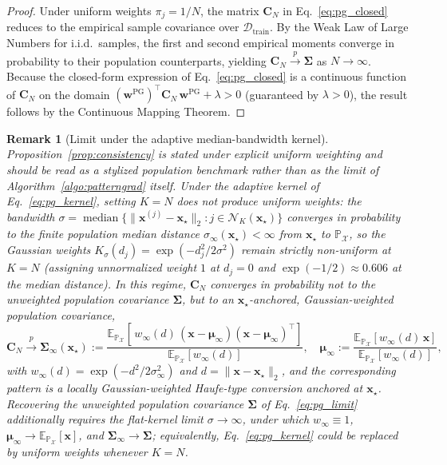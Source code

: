 \documentclass[pdflatex,sn-mathphys-num]{sn-jnl}
\theoremstyle{thmstyleone}
\theoremstyle{thmstyletwo}%
\newtheorem{remark}{Remark}%
\theoremstyle{thmstylethree}%
\begin{document}
\begin{proof}
Under uniform weights $\pi_j = 1/N$, the matrix $\mathbf{C}_N$ in Eq.~\eqref{eq:pg_closed} reduces to the empirical sample covariance over $\mathcal{D}_{\text{train}}$. By the Weak Law of Large Numbers for i.i.d.\ samples, the first and second empirical moments converge in probability to their population counterparts, yielding $\mathbf{C}_N \xrightarrow{p} \boldsymbol{\Sigma}$ as $N \to \infty$. Because the closed-form expression of Eq.~\eqref{eq:pg_closed} is a continuous function of $\mathbf{C}_N$ on the domain $(\mathbf{w}^{\text{PG}})^\top \mathbf{C}_N\, \mathbf{w}^{\text{PG}} + \lambda > 0$ (guaranteed by $\lambda > 0$), the result follows by the Continuous Mapping Theorem.
\end{proof}

\begin{remark}[Limit under the adaptive median-bandwidth kernel]\label{rem:adaptivelimit}
Proposition~\ref{prop:consistency} is stated under explicit uniform weighting and should be read as a stylized population benchmark rather than as the limit of Algorithm~\ref{algo:patterngrad} itself. Under the adaptive kernel of Eq.~\eqref{eq:pg_kernel}, setting $K = N$ does not produce uniform weights: the bandwidth $\sigma = \operatorname{median}\{\|\mathbf{x}^{(j)} - \mathbf{x}_\star\|_2 : j \in \mathcal{N}_K(\mathbf{x}_\star)\}$ converges in probability to the finite population median distance $\sigma_\infty(\mathbf{x}_\star) < \infty$ from $\mathbf{x}_\star$ to $\mathbb{P}_{\mathcal{X}}$, so the Gaussian weights $K_\sigma(d_j) = \exp(-d_j^2 / 2\sigma^2)$ remain strictly non-uniform at $K = N$ (assigning unnormalized weight $1$ at $d_j = 0$ and $\exp(-1/2) \approx 0.606$ at the median distance). In this regime, $\mathbf{C}_N$ converges in probability not to the unweighted population covariance $\boldsymbol{\Sigma}$, but to an $\mathbf{x}_\star$-anchored, Gaussian-weighted population covariance,
\begin{equation*}
    \mathbf{C}_N \xrightarrow{p} \boldsymbol{\Sigma}_\infty(\mathbf{x}_\star) \mathrel{:=} \frac{\mathbb{E}_{\mathbb{P}_{\mathcal{X}}}\!\left[\, w_\infty(d)\, (\mathbf{x} - \boldsymbol{\mu}_\infty)(\mathbf{x} - \boldsymbol{\mu}_\infty)^\top \right]}{\mathbb{E}_{\mathbb{P}_{\mathcal{X}}}[w_\infty(d)]}, \quad \boldsymbol{\mu}_\infty \mathrel{:=} \frac{\mathbb{E}_{\mathbb{P}_{\mathcal{X}}}[w_\infty(d)\,\mathbf{x}]}{\mathbb{E}_{\mathbb{P}_{\mathcal{X}}}[w_\infty(d)]},
\end{equation*}
with $w_\infty(d) = \exp(-d^2 / 2\sigma_\infty^2)$ and $d = \|\mathbf{x} - \mathbf{x}_\star\|_2$, and the corresponding pattern is a locally Gaussian-weighted Haufe-type conversion anchored at $\mathbf{x}_\star$. Recovering the unweighted population covariance $\boldsymbol{\Sigma}$ of Eq.~\eqref{eq:pg_limit} additionally requires the flat-kernel limit $\sigma \to \infty$, under which $w_\infty \equiv 1$, $\boldsymbol{\mu}_\infty \to \mathbb{E}_{\mathbb{P}_{\mathcal{X}}}[\mathbf{x}]$, and $\boldsymbol{\Sigma}_\infty \to \boldsymbol{\Sigma}$; equivalently, Eq.~\eqref{eq:pg_kernel} could be replaced by uniform weights whenever $K = N$.
\end{remark}
\end{document}

